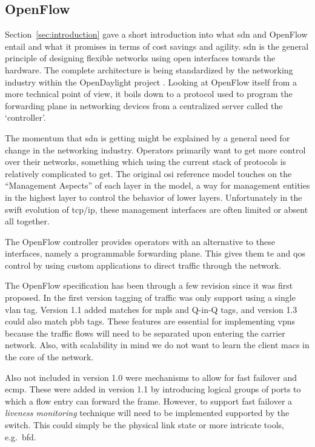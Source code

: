 

\subsection{OpenFlow} %
\label{sub:openflow}
Section~\ref{sec:introduction} gave a short introduction into what \ac{sdn} and OpenFlow entail and what it promises in terms of cost savings and agility. \acl{sdn} is the general principle of designing flexible networks using open interfaces towards the hardware. The complete architecture is being standardized by the networking industry within the OpenDaylight project \cite{opendaylight}. Looking at OpenFlow itself from a more technical point of view, it boils down to a protocol used to program the forwarding plane in networking devices from a centralized server called the `controller'. 

The momentum that \ac{sdn} is getting might be explained by a general need for change in the networking industry. Operators primarily want to get more control over their networks, something which using the current stack of protocols is relatively complicated to get. The original \acs{osi} reference model \cite{zimmermann} touches on the ``Management Aspects'' of each layer in the model, a way for management entities in the highest layer to control the behavior of lower layers. Unfortunately in the swift evolution of \ac{tcp}/\ac{ip}, these management interfaces are often limited or absent all together. 

The OpenFlow controller provides operators with an alternative to these interfaces, namely a programmable forwarding plane. This gives them \ac{te} and \ac{qos} control by using custom applications to direct traffic through the network. 

The OpenFlow specification has been through a few revision since it was first proposed. In the first version tagging of traffic was only support using a single \acs{vlan} tag. Version 1.1 added matches for \ac{mpls} and Q-in-Q tags, and version 1.3 could also match \ac{pbb} tags. These features are essential for implementing \acp{vpn} because the traffic flows will need to be separated upon entering the carrier network. Also, with scalability in mind we do not want to learn the client \acsp{mac} in the core of the network.

Also not included in version 1.0 were mechanisms to allow for fast failover and \ac{ecmp}. These were added in version 1.1 by introducing logical groups of ports to which a flow entry can forward the frame. However, to support fast failover a \textsl{liveness monitoring} technique will need to be implemented supported by the switch. This could simply be the physical link state or more intricate tools, e.g.\ \ac{bfd}.


